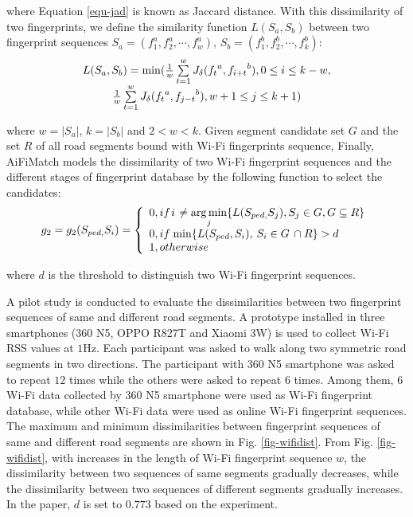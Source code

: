 \documentclass{llncs}
\begin{document}
where Equation \ref{equ-jad} is known as Jaccard distance. With this dissimilarity of two fingerprints, we define the similarity function $L(S_a, S_b)$ between two fingerprint sequences $S_a = (f_1^a,f_2^a,\cdots,f_w^a)$, $S_b = (f_1^b, f_2^b, \cdots, f_k^b)$:
\begin{equation}
\begin{array}{c}
L({S_a},{\rm{ }}{S_b}) = \min (\frac{1}{w}\sum\limits_{t = 1}^w {{J_\delta }({f_t}^a,{f_{i + t}}^b),0 \le i \le k - w,} \\
\frac{1}{w}\sum\limits_{t = 1}^w {{J_\delta }({f_t}^a,{f_{j - t}}^b),w + 1 \le j \le k + 1} )
\end{array}
\end{equation}

where $w=|S_a|$, $k=|S_b|$ and $2<w<k$. Given segment candidate set $G$ and the set $R$ of all road segments bound with Wi-Fi fingerprints sequence, Finally, AiFiMatch models the dissimilarity of two Wi-Fi fingerprint sequences and the different stages of fingerprint database by the following function to select the candidates: 
\begin{equation}
{g_2} = {g_2}({S_{ped,}}{S_i}) = \left\{ {\begin{array}{*{20}{l}}
	{0,if{\kern 1pt} i{\kern 1pt}  \ne \mathop {\arg \min }\limits_j \{ L({S_{ped,}}{S_j}),{S_j} \in G,G \subseteq R\} }\\
	{0,if{\kern 1pt} \min \{ L({S_{ped}},{S_i}),{\kern 1pt} {\kern 1pt} {S_i} \in G{\kern 1pt} {\kern 1pt}  \cap R\}  > d{\kern 1pt} {\kern 1pt} }\\
	{1,otherwise}
	\end{array}} \right.
\end{equation}

where $d$ is the threshold to distinguish two Wi-Fi fingerprint sequences. 

A pilot study is conducted to evaluate the dissimilarities between two fingerprint sequences of same and different road segments. A prototype installed in three smartphones (360 N5, OPPO R827T and Xiaomi 3W) is used to collect Wi-Fi RSS values at $1$Hz. Each participant was asked to walk along two symmetric road segments in two directions. The participant with 360 N5 smartphone was asked to repeat $12$ times while the others were asked to repeat $6$ times. Among them, $6$ Wi-Fi data collected by 360 N5 smartphone were used as Wi-Fi fingerprint database, while other Wi-Fi data were used as online Wi-Fi fingerprint sequences. The maximum and minimum dissimilarities between fingerprint sequences of same and different road segments are shown in Fig. \ref{fig-wifidist}. From Fig. \ref{fig-wifidist}, with increases in the length of Wi-Fi fingerprint sequence $w$, the dissimilarity between two sequences of same segments gradually decreases, while the dissimilarity between two sequences of different segments gradually increases. In the paper, $d$ is set to $0.773$ based on the experiment. 
\end{document}
